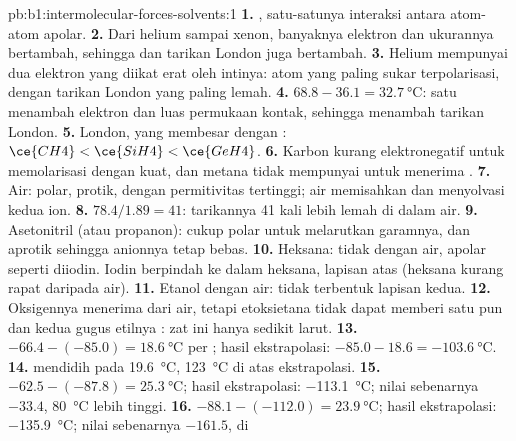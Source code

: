 \begin{solution}{pb:b1:intermolecular-forces-solvents:1}
\textbf{1.} , satu-satunya interaksi antara atom-atom
apolar.
\textbf{2.} Dari helium sampai xenon, banyaknya elektron dan ukurannya
bertambah, sehingga  dan tarikan London juga bertambah.
\textbf{3.} Helium mempunyai dua elektron yang diikat erat oleh intinya:
atom yang paling sukar terpolarisasi, dengan tarikan London yang paling
lemah.
\textbf{4.} $68.8 - 36.1 = \qty{32.7}{\celsius}$: satu  menambah
elektron dan luas permukaan kontak, sehingga menambah tarikan London.
\textbf{5.} London, yang membesar dengan : $\ce{CH4} < \ce{SiH4} <
\ce{GeH4}$.
\textbf{6.} Karbon kurang elektronegatif untuk memolarisasi 
dengan kuat, dan metana tidak mempunyai  untuk
menerima .
\textbf{7.} Air: polar, protik, dengan permitivitas tertinggi; air
memisahkan dan menyolvasi kedua ion.
\textbf{8.} $78.4/1.89 = 41$: tarikannya 41 kali lebih lemah di dalam
air.
\textbf{9.} Asetonitril (atau propanon): cukup polar untuk melarutkan
garamnya, dan aprotik sehingga anionnya tetap bebas.
\textbf{10.} Heksana: tidak  dengan air, apolar seperti
diiodin. Iodin berpindah ke dalam heksana, lapisan atas (heksana kurang
rapat daripada air).
\textbf{11.} Etanol  dengan air: tidak terbentuk lapisan
kedua.
\textbf{12.} Oksigennya menerima  dari air, tetapi
etoksietana tidak dapat memberi satu pun dan kedua gugus etilnya
: zat ini hanya sedikit larut.
\textbf{13.} $-66.4 - (-85.0) = \qty{18.6}{\celsius}$ per ;
 hasil ekstrapolasi: $-85.0 - 18.6 = \qty{-103.6}{\celsius}$.
\textbf{14.}  mendidih pada \qty{19.6}{\celsius},
\qty{123}{\celsius} di atas ekstrapolasi.
\textbf{15.} $-62.5 - (-87.8) = \qty{25.3}{\celsius}$;  hasil
ekstrapolasi: \qty{-113.1}{\celsius}; nilai sebenarnya $-33.4$,
\qty{80}{\celsius} lebih tinggi.
\textbf{16.} $-88.1 - (-112.0) = \qty{23.9}{\celsius}$;  hasil
ekstrapolasi: \qty{-135.9}{\celsius}; nilai sebenarnya $-161.5$, di

\end{solution}
